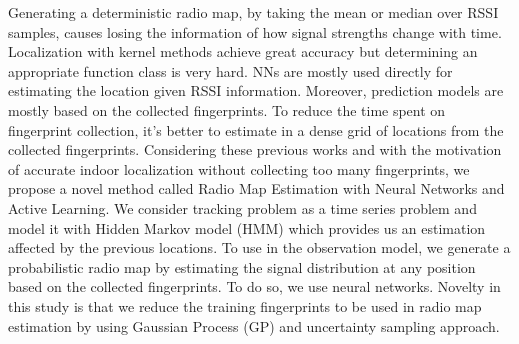 \documentclass{article}
\begin{document}
% 	
	Generating a deterministic radio map, by taking the mean or median over RSSI samples, causes losing the information of how signal strengths change with time. Localization with kernel methods achieve great accuracy \cite{Roo2002} but determining an appropriate function class is very hard. NNs are mostly used directly for estimating the location given RSSI information. Moreover, prediction models are mostly based on the collected fingerprints. To reduce the time spent on fingerprint collection, it's better to estimate in a dense grid of locations from the collected fingerprints. Considering these previous works and with the motivation of accurate indoor localization without collecting too many fingerprints, we propose a novel method called Radio Map Estimation with Neural Networks and Active Learning. We consider tracking problem as a time series problem and model it with Hidden Markov model (HMM) which provides us an estimation affected by the previous locations. To use in the observation model, we generate a probabilistic radio map by estimating the signal distribution at any position based on the collected fingerprints. To do so, we use neural networks. Novelty in this study is that we reduce the training fingerprints to be used in radio map estimation by using Gaussian Process (GP) and uncertainty sampling approach.
	
\end{document}
